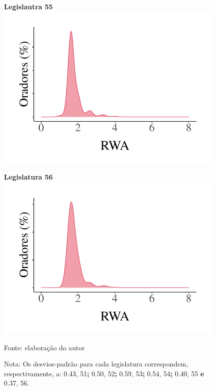 \documentclass[
12pt,				%
openright,			%
twoside,			%
a4paper,			%
english,			%
french,				%
spanish,			%
brazil				%
]{abntex2}
\begin{document}
\begin{figure}[!htb]
\begin{minipage}[b]{0.3\textwidth}
	\end{minipage}
	\\
	\hspace{.05\linewidth}
	\begin{minipage}[b]{0.3\textwidth}
		\textbf{Legislautra 55}
		\label{fig:dense_rwa_55}
		\centering
		\includegraphics[width=1\linewidth]{figures/dense_rwa_55}
		
	\end{minipage}
	\hspace{.05\linewidth}
	\begin{minipage}[b]{0.3\textwidth}
		\textbf{Legislatura 56}
		\label{fig:dense_rwa_56}
		\centering
		\includegraphics[width=1\linewidth]{figures/dense_rwa_56}
		
	\end{minipage}	
	
	Fonte: elaboração do autor
	\begin{flushleft}
		Nota: Os desvios-padrão para cada legislatura correspondem, respectivamente, a: 0.43, 51\textbf{;} 0.50, 52\textbf{;} 0.59, 53\textbf{;} 0.54, 54\textbf{;} 0.40, 55 \textbf{e} 0.37, 56. 
	\end{flushleft} 
\end{figure}
\end{document}
